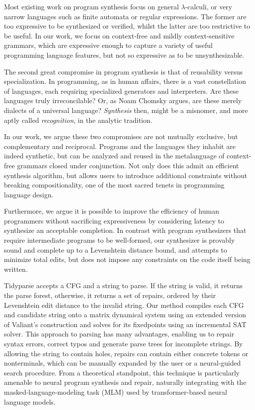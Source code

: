 \documentclass[sigplan,review,anonymous,acmsmall]{acmart}\settopmatter{printfolios=false,printccs=false,printacmref=false}
\begin{document}
Most existing work on program synthesis focus on general $\lambda$-calculi, or very narrow languages such as finite automata or regular expressions. The former are too expressive to be synthesized or verified, whilst the latter are too restrictive to be useful. In our work, we focus on context-free and mildly context-sensitive grammars, which are expressive enough to capture a variety of useful programming language features, but not so expressive as to be unsynthesizable.

The second great compromise in program synthesis is that of reusability versus specialization. In programming, as in human affairs, there is a vast constellation of languages, each requiring specialized generators and interpreters. Are these languages truly irreconcilable? Or, as Noam Chomsky argues, are these merely dialects of a universal language? \textit{Synthesis} then, might be a misnomer, and more aptly called \textit{recognition}, in the analytic tradition.

In our work, we argue these two compromises are not mutually exclusive, but complementary and reciprocal. Programs and the languages they inhabit are indeed synthetic, but can be analyzed and reused in the metalanguage of context-free grammars closed under conjunction. Not only does this admit an efficient synthesis algorithm, but allows users to introduce additional constraints without breaking compositionality, one of the most sacred tenets in programming language design.

Furthermore, we argue it is possible to improve the efficiency of human programmers without sacrificing expressiveness by considering latency to synthesize an acceptable completion. In contrast with program synthesizers that require intermediate programs to be well-formed, our synthesizer is provably sound and complete up to a Levenshtein distance bound, and attempts to minimize total edits, but does not impose any constraints on the code itself being written.

Tidyparse accepts a CFG and a string to parse. If the string is valid, it returns the parse forest, otherwise, it returns a set of repairs, ordered by their Levenshtein edit distance to the invalid string. Our method compiles each CFG and candidate string onto a matrix dynamical system using an extended version of Valiant's construction and solves for its fixedpoints using an incremental SAT solver. This approach to parsing has many advantages, enabling us to repair syntax errors, correct typos and generate parse trees for incomplete strings. By allowing the string to contain holes, repairs can contain either concrete tokens or nonterminals, which can be manually expanded by the user or a neural-guided search procedure. From a theoretical standpoint, this technique is particularly amenable to neural program synthesis and repair, naturally integrating with the masked-language-modeling task (MLM) used by transformer-based neural language models.
\end{document}

